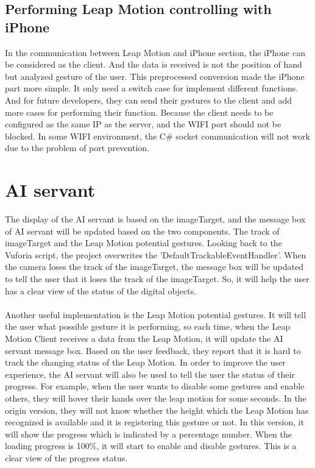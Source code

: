 \subsection{Performing Leap Motion controlling with iPhone}
In the communication between Leap Motion and iPhone section, the iPhone can be considered as the client. And the data is received is not the position of hand but analyzed gesture of the user. This preprocessed conversion made the iPhone part more simple. It only need a switch case for implement different functions. And for future developers, they can send their gestures to the client and add more cases for performing their function. Because the client needs to be configured as the same IP as the server, and the WIFI port should not be blocked. In some WIFI environment, the C\# socket communication will not work due to the problem of port prevention.

\section{AI servant}
The display of the AI servant is based on the imageTarget, and the message box of AI servant will be updated based on the two components. The track of imageTarget and the Leap Motion potential gestures. Looking back to the Vuforia script, the project overwrites the 'DefaultTrackableEventHandler'. When the camera loses the track of the imageTarget, the message box will be updated to tell the user that it loses the track of the imageTarget. So, it will help the user has a clear view of the status of the digital objects. 
\\
\\
Another useful implementation is the Leap Motion potential gestures. It will tell the user what possible gesture it is performing, so each time, when the Leap Motion Client receives a data from the Leap Motion, it will update the AI servant message box. Based on the user feedback, they report that it is hard to track the changing status of the Leap Motion. In order to improve the user experience, the AI servant will also be used to tell the user the status of their progress. For example, when the user wants to disable some gestures and enable others, they will hover their hands over the leap motion for some seconds. In the origin version, they will not know whether the height which the Leap Motion has recognized is available and it is registering this gesture or not. In this version, it will show the progress which is indicated by a percentage number. When the loading progress is 100\%, it will start to enable and disable gestures. This is a clear view of the progress status.

